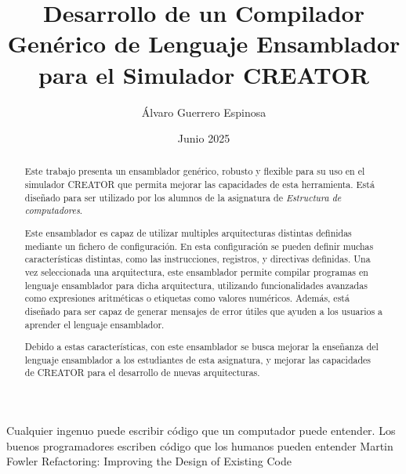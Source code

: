 \documentclass[es]{uc3mthesisIEEE}
\title{Desarrollo de un Compilador Genérico de Lenguaje Ensamblador para el Simulador CREATOR}
\author{Álvaro Guerrero Espinosa}
\date{Junio 2025}
\begin{document}
  \makecover


  \makeepigraph
    {Cualquier ingenuo puede escribir código que un computador puede entender. Los buenos programadores escriben código que los humanos pueden entender}  %
    {Martin Fowler}  %
    {Refactoring: Improving the Design of Existing Code}  %


  \begin{acknowledgements}
  \end{acknowledgements}


  \begin{abstract}
    Este trabajo presenta un ensamblador genérico, robusto y flexible para su
    uso en el simulador CREATOR que permita mejorar las capacidades de esta
    herramienta. Está diseñado para ser utilizado por los alumnos de la
    asignatura de \textit{Estructura de computadores}.

    Este ensamblador es capaz de utilizar multiples arquitecturas distintas
    definidas mediante un fichero de configuración. En esta configuración se
    pueden definir muchas características distintas, como las instrucciones,
    registros, y directivas definidas. Una vez seleccionada una arquitectura,
    este ensamblador permite compilar programas en lenguaje ensamblador para
    dicha arquitectura, utilizando funcionalidades avanzadas como expresiones
    aritméticas o etiquetas como valores numéricos. Además, está diseñado para
    ser capaz de generar mensajes de error útiles que ayuden a los usuarios a
    aprender el lenguaje ensamblador.

    Debido a estas características, con este ensamblador se busca mejorar la
    enseñanza del lenguaje ensamblador a los estudiantes de esta asignatura, y
    mejorar las capacidades de CREATOR para el desarrollo de nuevas arquitecturas.

  \end{abstract}


  \tableofcontents
  \listoffigures
  \listoftables


  \begin{thesis}
  \end{thesis}
\end{document}

